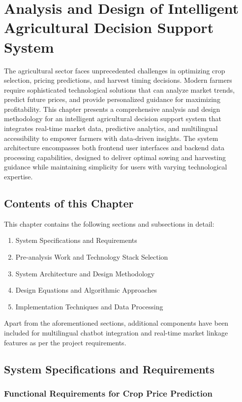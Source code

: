 \chapter{Analysis and Design of Intelligent Agricultural Decision Support System}

The agricultural sector faces unprecedented challenges in optimizing crop selection, pricing predictions, and harvest timing decisions. Modern farmers require sophisticated technological solutions that can analyze market trends, predict future prices, and provide personalized guidance for maximizing profitability. This chapter presents a comprehensive analysis and design methodology for an intelligent agricultural decision support system that integrates real-time market data, predictive analytics, and multilingual accessibility to empower farmers with data-driven insights. The system architecture encompasses both frontend user interfaces and backend data processing capabilities, designed to deliver optimal sowing and harvesting guidance while maintaining simplicity for users with varying technological expertise.

\section{Contents of this Chapter}

This chapter contains the following sections and subsections in detail:
\begin{enumerate}
\item System Specifications and Requirements
\item Pre-analysis Work and Technology Stack Selection
\item System Architecture and Design Methodology
\item Design Equations and Algorithmic Approaches
\item Implementation Techniques and Data Processing
\end{enumerate}
Apart from the aforementioned sections, additional components have been included for multilingual chatbot integration and real-time market linkage features as per the project requirements.

\section{System Specifications and Requirements}

\subsection{Functional Requirements for Crop Price Prediction}

